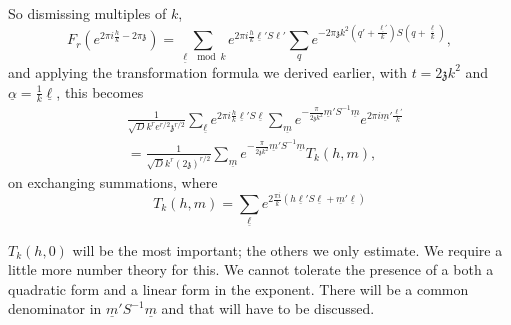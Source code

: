 So dismissing multiples of $k$, 
$$
F_r (e^{2 \pi i \frac{h}{k} - 2 \pi \mathfrak{z}})  =
\sum_{\underline{\ell} \mod k} e^{2 \pi i \frac{h}{k}
  \underline{\ell}' S \ell'} \sum_{q} e^{- 2 \pi \mathfrak{z} k^2 (q'
  + \frac{\underline{\ell'}}{k}) S \left(q+ \frac{\underline{\ell}}{k} \right)},
$$
and applying the transformation formula we derived earlier, with $t= 2
\mathfrak{z} k^2$ and $\underline{\alpha}= \frac{1}{k}
\underline{\ell}$, this becomes
\begin{align*}
  & \frac{1}{\sqrt{D} k^r e^{r/2} \mathfrak{z}^{r/2}}
  \sum_{\underline{\ell}} e^{2 \pi i \frac{h}{k}\underline{\ell}' S
    \underline{\ell} } \sum_{\underline{m}} e^{- \frac{\pi}{2
      \mathfrak{z} k^2} \underline{m}' S^{-1} \underline{m}} e^{2 \pi
    i \underline{m}' \frac{\underline{\ell}'}{k}}\\
  & = \frac{1}{\sqrt{D} k^r (2 \mathfrak{z})^{r/2}}
  \sum_{\underline{m}} e^{- \frac{\pi}{2 \mathfrak{z} k^2}
    \underline{m}' S^{-1} \underline{m}} T_k (h, m),
\end{align*}\pageoriginale 
on exchanging summations, where
$$
T_k (h, m) = \sum_{\underline{\ell}} e^{2 \frac{\pi i}{k}(h
  \underline{\ell}' S\underline{\ell}+ \underline{m}' \underline{\ell})}
$$

$T_k (h, 0)$ will be the most important; the others we only
estimate. We require a little more number theory for this. We cannot
tolerate the presence of a both a quadratic form and a linear form in
the exponent. There will be a common denominator in $\underline{m}'
S^{-1} \underline{m}$ and that will have to be discussed.

